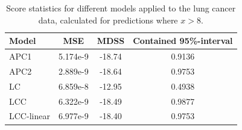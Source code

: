 \begin{table}
    \begin{center}
        \begin{tabular}{l |c c c }
            Model & MSE &   MDSS & Contained 95\%-interval\\
            \hline
            APC1    & 5.174e-9 & -18.74    & 0.9136 \\
            APC2    & 2.889e-9 & -18.64    & 0.9753 \\
            LC         & 6.859e-8 & -12.95    & 0.4938 \\
            LCC        & 6.322e-9 & -18.49    & 0.9877 \\
            LCC-linear & 6.977e-9 & -18.40    & 0.9753 \\
        \end{tabular}
        \caption{Score statistics for different models applied to the lung cancer data, calculated for predictions where $x > 8$.}\label{tbl:uv-lung-8}
    \end{center}
\end{table}


